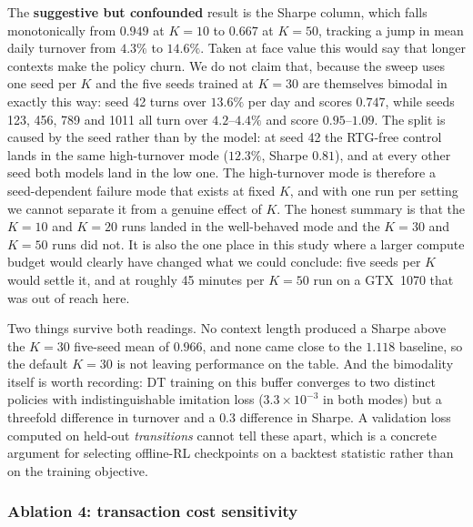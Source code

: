 \documentclass[11pt]{article}
\begin{document}
The \textbf{suggestive but confounded} result is the Sharpe column, which falls monotonically
from $0.949$ at $K=10$ to $0.667$ at $K=50$, tracking a jump in mean daily turnover from
$4.3\%$ to $14.6\%$. Taken at face value this would say that longer contexts make the policy
churn. We do not claim that, because the sweep uses one seed per $K$ and the five seeds trained
at $K=30$ are themselves bimodal in exactly this way: seed 42 turns over $13.6\%$ per day and
scores $0.747$, while seeds 123, 456, 789 and 1011 all turn over $4.2$--$4.4\%$ and score
$0.95$--$1.09$. The split is caused by the seed rather than by the model: at seed 42 the RTG-free
control lands in the same high-turnover mode ($12.3\%$, Sharpe $0.81$), and at every other seed
both models land in the low one. The high-turnover mode is therefore a seed-dependent failure
mode that exists at fixed $K$, and with one run per setting we cannot separate it from a genuine effect of $K$. The
honest summary is that the $K=10$ and $K=20$ runs landed in the well-behaved mode and the $K=30$
and $K=50$ runs did not. It is also the one place in this study where a larger compute budget
would clearly have changed what we could conclude: five seeds per $K$ would settle it, and at
roughly 45 minutes per $K=50$ run on a GTX~1070 that was out of reach here.

Two things survive both readings. No context length produced a Sharpe above the $K=30$ five-seed
mean of $0.966$, and none came close to the $1.118$ baseline, so the default $K=30$ is not
leaving performance on the table. And the bimodality itself is worth recording: DT training on
this buffer converges to two distinct policies with indistinguishable imitation loss
($3.3\times 10^{-3}$ in both modes) but a threefold difference in turnover and a $0.3$ difference
in Sharpe. A validation loss computed on held-out \emph{transitions} cannot tell these apart,
which is a concrete argument for selecting offline-RL checkpoints on a backtest statistic rather
than on the training objective.


\subsubsection{Ablation 4: transaction cost sensitivity}
\label{sec:ablation-cost}
\end{document}
